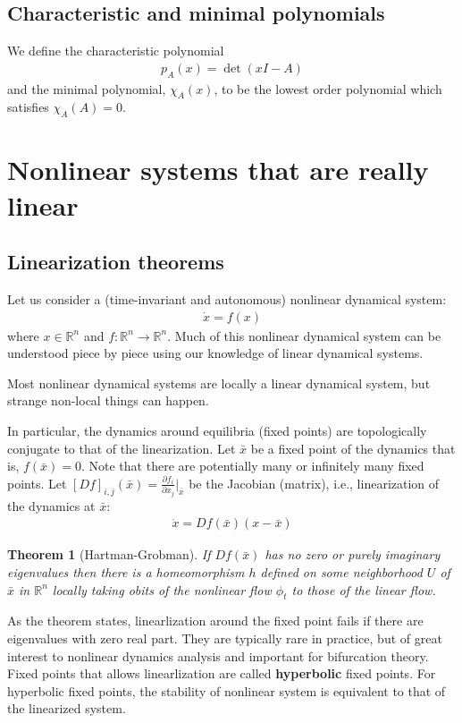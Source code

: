 \documentclass[a4paper,11pt]{exam}
\newtheorem{theorem}{Theorem}
\newcounter{ct}
\newcommand{\field}[1]{\ensuremath{\mathbb{#1}}}
\newcommand{\reals}{\field{R}}
\begin{document}
\begin{questions}
\subsection{Characteristic and minimal polynomials}
We define the characteristic polynomial 
\begin{align}
    p_{A}(x) = \det \left( x I - A \right)
\end{align}
and the minimal polynomial, $\chi_A(x)$, to be the lowest order polynomial which satisfies $\chi_A(A) = 0$.

\section{Nonlinear systems that are really linear}
\subsection{Linearization theorems}
Let us consider a (time-invariant and autonomous) nonlinear dynamical system:
\begin{align}
    \dot{x} = f(x)
\end{align}
where $x \in \reals^n$ and $f: \reals^n \to \reals^n$.
Much of this nonlinear dynamical system can be understood piece by piece using our knowledge of linear dynamical systems.

\begin{tcolorbox}[colback=black!1!,title=Linearize that beast!]
    Most nonlinear dynamical systems are locally a linear dynamical system, but strange non-local things can happen.
\end{tcolorbox}

In particular, the dynamics around equilibria (fixed points) are topologically conjugate to that of the linearization.
Let $\bar{x}$ be a fixed point of the dynamics that is, $f(\bar{x}) = 0$.
Note that there are potentially many or infinitely many fixed points.
Let $[Df]_{i,j}(\bar{x}) = \frac{\partial f_i}{\partial x_j}\bigr\rvert_{\bar{x}}$ be the Jacobian (matrix), i.e., linearization of the dynamics at $\bar{x}$:
\begin{align}\label{eq:linearized_around_FP}
    \dot{x} = Df(\bar{x}) (x - \bar{x})
\end{align}


\begin{theorem}[Hartman-Grobman]
    If $Df(\bar{x})$ has no zero or purely imaginary eigenvalues then there is a homeomorphism $h$ defined on some neighborhood $U$ of $\bar{x}$ in $\reals^n$ locally taking obits of the nonlinear flow $\phi_t$ to those of the linear flow.
\end{theorem}
As the theorem states, linearlization around the fixed point fails if there are eigenvalues with zero real part.
They are typically rare in practice, but of great interest to nonlinear dynamics analysis and important for bifurcation theory.
Fixed points that allows linearlization are called \textbf{hyperbolic} fixed points.
For hyperbolic fixed points, the stability of nonlinear system is equivalent to that of the linearized system.


\end{questions}
\end{document}
